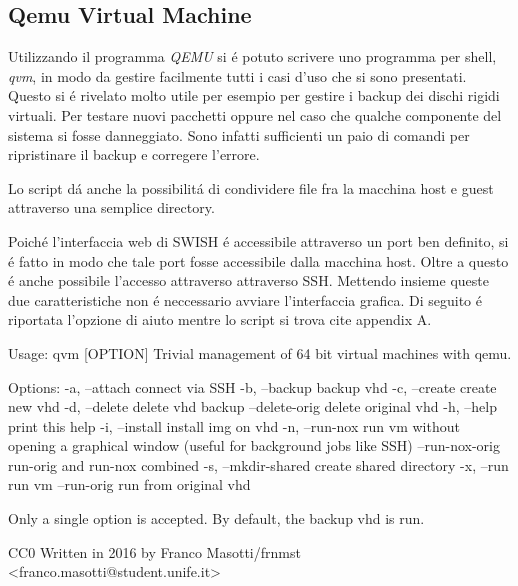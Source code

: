 \documentclass[10pt,titlepage,twoside,a4paper]{report}
\newenvironment{code}{\singlespacing\captionsetup{type=listing}}{}
\begin{document}
\subsection{Qemu Virtual Machine}
Utilizzando il programma \emph{QEMU}\cite{QEMU} si \'e potuto scrivere uno 
programma per 
shell, \emph{qvm}, in modo da gestire facilmente tutti i casi d'uso che si 
sono presentati\cite{qvm}. Questo si \'e rivelato molto utile per esempio per 
gestire i backup  dei dischi rigidi virtuali. Per testare nuovi 
pacchetti oppure nel caso che qualche componente del sistema si fosse 
danneggiato. Sono infatti sufficienti un paio di comandi per ripristinare il 
backup e corregere l'errore.

Lo script d\'a anche la possibilit\'a di condividere file fra la macchina host 
e guest attraverso una semplice directory.

Poich\'e l'interfaccia web di SWISH \'e accessibile attraverso un port ben 
definito, si \'e fatto in modo che tale port fosse accessibile dalla macchina 
host. Oltre a questo \'e anche possibile l'accesso attraverso attraverso SSH. 
Mettendo insieme queste due caratteristiche non \'e neccessario avviare 
l'interfaccia grafica. Di seguito \'e riportata l'opzione di aiuto mentre lo 
script si trova  cite appendix A.

\begin{code}
    \caption{Pagina di aiuto di qvm}
    \begin{textcode*}{}
Usage: qvm [OPTION]
Trivial management of 64 bit virtual machines with qemu.

Options:
    -a, --attach                connect via SSH
    -b, --backup                backup vhd
    -c, --create                create new vhd
    -d, --delete                delete vhd backup
        --delete-orig           delete original vhd
    -h, --help                  print this help
    -i, --install               install img on vhd
    -n, --run-nox               run vm without opening a graphical window
                                (useful for background jobs like SSH)
        --run-nox-orig          run-orig and run-nox combined
    -s, --mkdir-shared          create shared directory
    -x, --run                   run vm
        --run-orig              run from original vhd


Only a single option is accepted.
By default, the backup vhd is run.

CC0
Written in 2016 by Franco Masotti/frnmst <franco.masotti@student.unife.it>
    \end{textcode*}
\end{code}
\end{document}
